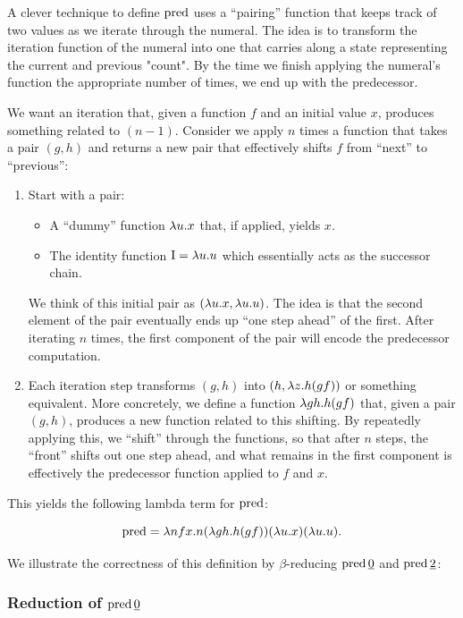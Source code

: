 A clever technique to define \(\mbox{pred}\) uses a ``pairing'' function that keeps
track of two values as we iterate through the numeral. The idea is to transform
the iteration function of the numeral into one that carries along a state
representing the current and previous "count". By the time we finish applying
the numeral's function the appropriate number of times, we end up with the
predecessor.

We want an iteration that, given a function \(f\) and an initial value \(x\),
produces something related to \((n-1)\). Consider we apply \(n\) times a
function that takes a pair \((g, h)\) and returns a new pair that effectively
shifts \(f\) from ``next'' to ``previous'':

\begin{enumerate}
  \item Start with a pair:
  \begin{itemize}
    \item A ``dummy'' function \(\lambda u.x\) that, if applied, yields \(x\).
    \item The identity function \(\mbox{I} = \lambda u.u\) which essentially acts as the successor chain.
  \end{itemize}
   We think of this initial pair as \((\lambda u.x, \lambda u.u)\). The idea is
   that the second element of the pair eventually ends up ``one step ahead'' of
   the first. After iterating \(n\) times, the first component of the pair will
   encode the predecessor computation.
  \item Each iteration step transforms \((g,h)\) into \((h, \lambda z.h(gf))\) or
something equivalent. More concretely, we define a function \(\lambda gh.h(gf)\)
that, given a pair \((g,h)\), produces a new function related to this shifting.
By repeatedly applying this, we ``shift'' through the functions, so that after
\(n\) steps, the ``front'' shifts out one step ahead, and what remains in the
first component is effectively the predecessor function applied to \(f\) and
\(x\).
\end{enumerate}


This yields the following lambda term for \(\mbox{pred}\):

\[
\mbox{pred} = \lambda nfx.n(\lambda gh.h(gf))(\lambda u.x)(\lambda u.u).
\]

We illustrate the correctness of this definition by $\beta$-reducing \(\mbox{pred}\,\underline{0}\) and \(\mbox{pred}\,\underline{2}\):

\subsubsection*{Reduction of \(\mbox{pred}\,\underline{0}\)}

